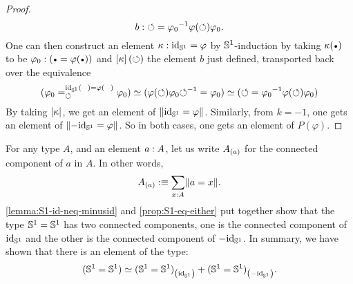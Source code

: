 \documentclass[english,a4]{article}
\renewcommand{\ap}[1]{\left[{#1}\right]}
\begin{document}
\begin{proof}
  \begin{displaymath}
    b: \mathord{\circlearrowleft} = {\varphi_0}^{-1} \varphi(\mathord{\circlearrowleft})\varphi_0.
  \end{displaymath}
  One can then construct an element $\kappa: \mathord{\mathrm{id}}_{{\mathbb S^{1}}} = \varphi$ by
  ${{\mathbb S^{1}}}$-induction by taking $\kappa(\base)$ to be
  $\varphi_0 \from (\base = \varphi(\base))$ and $\ap \kappa(\Sloop)$
  the element $b$ just defined, transported back over the equivalence
  \begin{displaymath}
    (\pathover {\varphi_0} {\id_\Sc(\blank)=\varphi(\blank)} \Sloop {\varphi_0}) \weq
    (\varphi(\Sloop) \varphi_0 \inv \Sloop = \varphi_0)
    \weq (\Sloop = \inv{\varphi_0} \varphi(\Sloop) \varphi_0)
  \end{displaymath}
  By taking $\lvert\kappa\rvert$, we get an element of
  $\lVert\mathord{\mathrm{id}}_{{\mathbb S^{1}}} = \varphi\rVert$. Similarly, from $k=-1$, one gets an
  element of $\lVert-\mathord{\mathrm{id}}_{{\mathbb S^{1}}} =\varphi\rVert$. So in both cases, one gets
  an element of $P(\varphi)$.
\end{proof}

For any type $A$, and an element $a: A$, let us write ${A}_{\left(a\right)}$
for the connected component of $a$ in $A$. In other words,
\begin{displaymath}
  {A}_{\left(a\right)} \mathrel{\hbox{:}\mkern-5mu\equiv} \sum_{x: A}\lVert a=x\rVert.
\end{displaymath}
\cref{lemma:S1-id-neq-minusid} and \cref{prop:S1-eq-either} put
together show that the type ${{\mathbb S^{1}}}={{\mathbb S^{1}}}$ has two connected components,
one is the connected component of $\mathord{\mathrm{id}}_{{\mathbb S^{1}}}$ and the other is the
connected component of $-\mathord{\mathrm{id}}_{{\mathbb S^{1}}}$. In summary, we have shown that
there is an element of the type:
\begin{displaymath}
  ({{\mathbb S^{1}}}={{\mathbb S^{1}}}) \simeq {({{\mathbb S^{1}}}={{\mathbb S^{1}}})}_{\left(\mathord{\mathrm{id}}_{{\mathbb S^{1}}}\right)} + {({{\mathbb S^{1}}}={{\mathbb S^{1}}})}_{\left(-\mathord{\mathrm{id}}_{{\mathbb S^{1}}}\right)}.
\end{displaymath}
\end{document}
